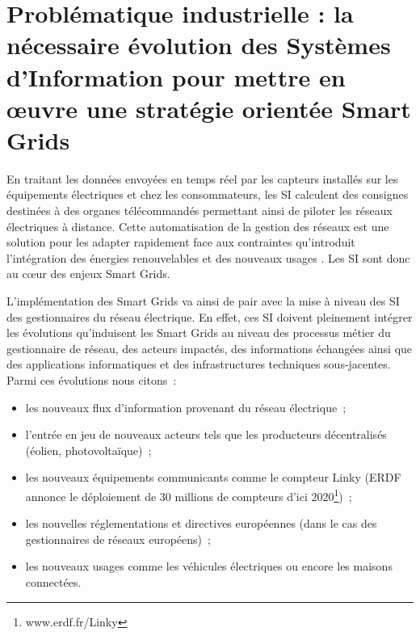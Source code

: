 \section{Problématique industrielle : la nécessaire évolution des Systèmes 
d'Information pour mettre en œuvre une stratégie orientée Smart Grids}


En traitant les données envoyées en temps réel par les capteurs installés sur les équipements électriques et chez les consommateurs, les SI calculent des consignes destinées à des organes télécommandés permettant ainsi de piloter les réseaux électriques à distance. 
Cette automatisation de la gestion des réseaux est une solution pour les adapter rapidement face aux contraintes qu'introduit l'intégration des énergies renouvelables et des nouveaux usages \cite{cre}. Les SI sont donc au cœur des enjeux Smart Grids.  

L'implémentation des Smart Grids va ainsi de pair avec la mise à niveau des SI des gestionnaires du réseau électrique. En effet, ces SI doivent pleinement intégrer les évolutions qu'induisent les Smart Grids au niveau des processus métier du gestionnaire de réseau, des acteurs impactés, des informations échangées ainsi que des applications informatiques et des infrastructures techniques sous-jacentes. Parmi ces évolutions nous citons~:
\begin{itemize}
\item les nouveaux flux d'information provenant du réseau électrique~;
\item l'entrée en jeu de nouveaux acteurs tels que les producteurs décentralisés (éolien, photovoltaïque)~;
\item les nouveaux équipements communicants comme le compteur Linky (ERDF 
annonce le déploiement de 30 millions de compteurs d'ici 
2020\footnote{www.erdf.fr/Linky})~;
\item les nouvelles réglementations et directives européennes (dans le cas des gestionnaires de réseaux européens)~;
\item les nouveaux usages comme les véhicules électriques ou encore les maisons connectées.
\end{itemize}

